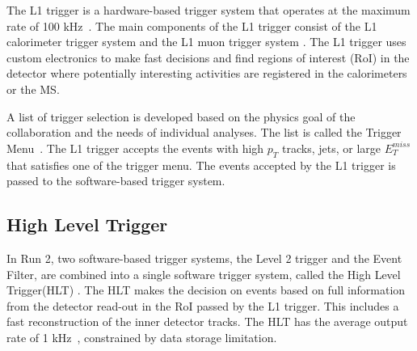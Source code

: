 The L1 trigger is a hardware-based trigger system that operates at the maximum rate of 100 \si{\kilo\hertz}~\cite{1742-6596-762-1-012003}. The main components of the L1 trigger consist of the L1 calorimeter trigger system and the L1 muon trigger system . The L1 trigger uses custom electronics to make fast decisions and find regions of interest (RoI) in the detector where potentially interesting activities are registered in the calorimeters or the MS.

A list of trigger selection is developed based on the physics goal of the collaboration and the needs of individual analyses. The list is called the Trigger Menu~\cite{VazquezSchroeder:2287548}. The L1 trigger accepts the events with high $p_{T}$ tracks, jets, or large $E_{T}^{miss}$ that satisfies one of the trigger menu. The events accepted by the L1 trigger is passed to the software-based trigger system.


\subsection{High Level Trigger}
\label{sec:atlas:hlt}

In Run 2, two software-based trigger systems, the Level 2 trigger and the Event Filter, are combined into a single software trigger system, called the High Level Trigger(HLT) . The HLT makes the decision on events based on full information from the detector read-out in the RoI passed by the L1 trigger. This includes a fast reconstruction of the inner detector tracks. The HLT has the average output rate of 1 \si{\kilo\hertz}~\cite{1742-6596-762-1-012003}, constrained by data storage limitation. 


